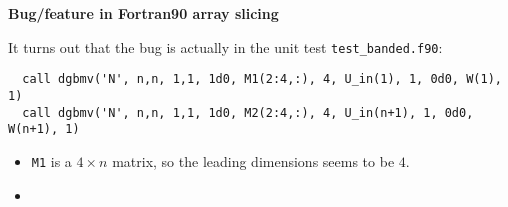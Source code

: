 \documentclass{slides}
\begin{document}
\begin{center}
{\large\bf Bug/feature in Fortran90 array slicing}
\end{center}

It turns out that the bug is actually in the unit test \verb+test_banded.f90+:

\begin{verbatim}
  call dgbmv('N', n,n, 1,1, 1d0, M1(2:4,:), 4, U_in(1), 1, 0d0, W(1), 1)
  call dgbmv('N', n,n, 1,1, 1d0, M2(2:4,:), 4, U_in(n+1), 1, 0d0, W(n+1), 1)
\end{verbatim}


\vspace*{-3ex}

\begin{itemize}
 \item \verb+M1+ is a $4 \times n$ matrix, so the leading dimensions seems to be $4$.
 \item
\end{itemize}
\end{document}
